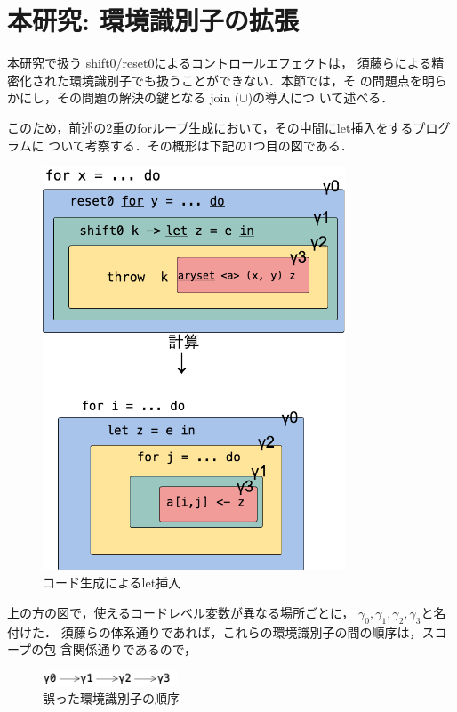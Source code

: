 \section{本研究: 環境識別子の拡張}

本研究で扱う shift0/reset0によるコントロールエフェクトは，
須藤らによる精密化された環境識別子でも扱うことができない．本節では，そ
の問題点を明らかにし，その問題の解決の鍵となる join ($\cup$)の導入につ
いて述べる．

このため，前述の2重のforループ生成において，その中間にlet挿入をするプログラムに
ついて考察する．その概形は下記の1つ目の図である．

\begin{figure}[ht]
  \centering
  \includegraphics[clip,height=12cm]{./img/ecex_for_non_gamma.png}
  \caption{コード生成によるlet挿入}
  \label{fig:ecex_for_non_gamma}
\end{figure}

上の方の図で，使えるコードレベル変数が異なる場所ごとに，
$\gamma_0,\gamma_1,\gamma_2,\gamma_3$と名付けた．
須藤らの体系通りであれば，これらの環境識別子の間の順序は，スコープの包
含関係通りであるので，

\begin{figure}[ht]
  \centering
  \includegraphics[clip,width=4cm]{./img/gamma_normal.png}
  \caption{誤った環境識別子の順序}
  \label{fig:gamma_normal}
\end{figure}


